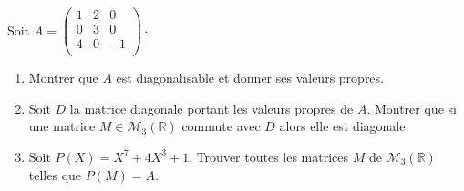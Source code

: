 \documentclass[a4paper,10pt]{report}
\begin{document}
\begin{Exa}Soit $A= \begin{pmatrix}
1 & 2 & 0 \\
0 & 3 & 0 \\
4 & 0 & -1 \\
\end{pmatrix}\cdot$
\begin{enumerate}
\item Montrer que $A$ est diagonalisable et donner ses valeurs propres.
\item Soit $D$ la matrice diagonale portant les valeurs propres de $A$. Montrer que si une matrice $M \in \mathcal{M}_3(\mathbb{R})$ commute avec $D$ alors elle est diagonale.
\item Soit $P(X)=X^7+ 4X^3+1$. Trouver toutes les matrices $M$ de $\mathcal{M}_3(\mathbb{R})$ telles que $P(M)=A$.
\end{enumerate}
\end{Exa}

\corr 
\end{document}
